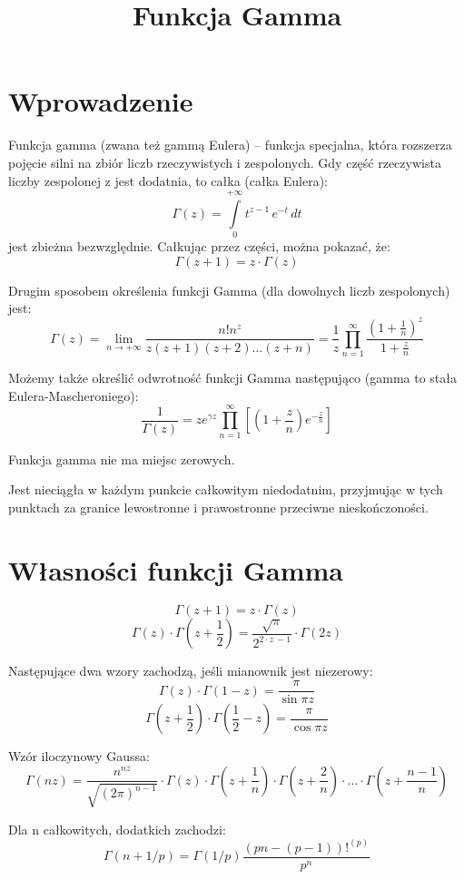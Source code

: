 \documentclass{article}
\begin{document}
\title{Funkcja Gamma}
\maketitle

\section*{Wprowadzenie}
Funkcja gamma (zwana też gammą Eulera) – funkcja specjalna, która rozszerza pojęcie silni na zbiór liczb rzeczywistych i zespolonych. Gdy część rzeczywista liczby zespolonej z jest dodatnia, to całka (całka Eulera): 
$$ \Gamma (z)=\int \limits _{0}^{+\infty }t^{z-1}\,e^{-t}\,dt $$
jest zbieżna bezwzględnie. Całkując przez części, można pokazać, że: 
$$ \Gamma (z+1)=z\cdot \Gamma (z) $$

Drugim sposobem określenia funkcji Gamma (dla dowolnych liczb zespolonych) jest: 
\[ \Gamma (z)=\lim _{n\rightarrow +\infty }{\frac {n!n^{z}}{z(z+1)(z+2)\ldots (z+n)}}={\frac {1}{z}}\prod _{n=1}^{\infty }{\frac {\left(1+{\frac {1}{n}}\right)^{z}}{1+{\frac {z}{n}}}} \]

Możemy także określić odwrotność funkcji Gamma następująco (gamma to stała Eulera-Mascheroniego): 
\begin{displaymath}
{\frac {1}{\Gamma (z)}}=ze^{\gamma z}\prod _{n=1}^{\infty }\left[\left(1+{\frac {z}{n}}\right)e^{-{\frac {z}{n}}}\right]
\end{displaymath}

Funkcja gamma nie ma miejsc zerowych.

Jest nieciągła w każdym punkcie całkowitym niedodatnim, przyjmując w tych punktach za granice lewostronne i prawostronne przeciwne nieskończoności.

\section*{Własności funkcji Gamma}
$$ \Gamma (z+1)=z\cdot \Gamma (z) $$
$$ \Gamma (z)\cdot \Gamma \left(z+ \frac{1}{2}\right) =\frac{\sqrt{\pi }}{2^{2\cdot z\ -1}}\cdot \Gamma (2z) $$

Następujące dwa wzory zachodzą, jeśli mianownik jest niezerowy: 
\[ \Gamma (z)\cdot \Gamma (1-z)={\frac {\pi }{\sin {\pi z}}} \]
\[ \Gamma \left(z+{\frac {1}{2}}\right)\cdot \Gamma \left({\frac {1}{2}}-z\right)={\frac {\pi }{\cos {\pi z}}} \]

Wzór iloczynowy Gaussa:
\begin{displaymath}
\Gamma (nz)={\frac {n^{nz}}{\sqrt {(2\pi )^{n-1}}}}\cdot \Gamma (z)\cdot \Gamma \left(z+{\frac {1}{n}}\right)\cdot \Gamma \left(z+{\frac {2}{n}}\right)\cdot \ldots \cdot \Gamma \left(z+{\frac {n-1}{n}}\right)
\end{displaymath}

Dla n całkowitych, dodatkich zachodzi:
\begin{equation*}
\Gamma (n+1/p)=\Gamma (1/p){\frac {(pn-(p-1))!^{(p)}}{p^{n}}}
\end{equation*}
\end{document}
